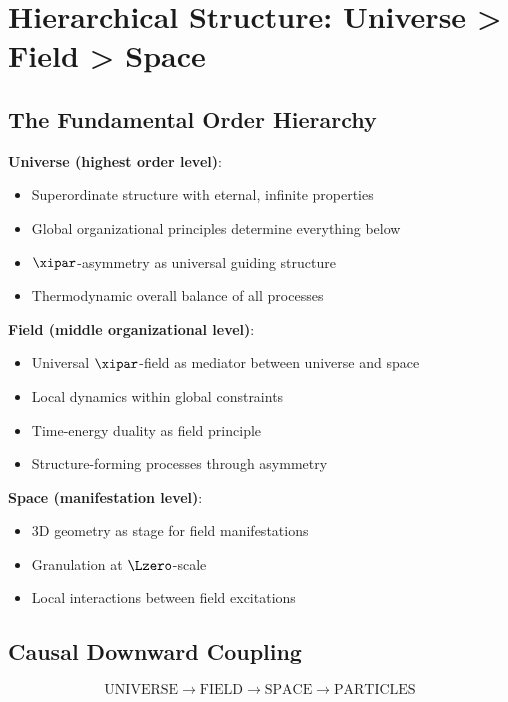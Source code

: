 	\section{Hierarchical Structure: Universe > Field > Space}
	
	\subsection{The Fundamental Order Hierarchy}
	
	\textbf{Universe (highest order level)}:
	\begin{itemize}
		\item Superordinate structure with eternal, infinite properties
		\item Global organizational principles determine everything below
		\item $\xipar$-asymmetry as universal guiding structure
		\item Thermodynamic overall balance of all processes
	\end{itemize}
	
	\textbf{Field (middle organizational level)}:
	\begin{itemize}
		\item Universal $\xipar$-field as mediator between universe and space
		\item Local dynamics within global constraints
		\item Time-energy duality as field principle
		\item Structure-forming processes through asymmetry
	\end{itemize}
	
	\textbf{Space (manifestation level)}:
	\begin{itemize}
		\item 3D geometry as stage for field manifestations
		\item Granulation at $\Lzero$-scale
		\item Local interactions between field excitations
	\end{itemize}
	
	\subsection{Causal Downward Coupling}
	
	\begin{equation}
		\text{UNIVERSE} \rightarrow \text{FIELD} \rightarrow \text{SPACE} \rightarrow \text{PARTICLES}
	\end{equation}
	
